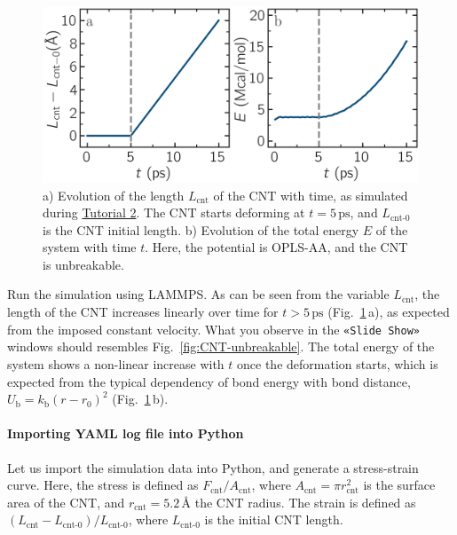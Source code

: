 \documentclass[9pt,tutorial]{livecoms}
\newcommand{\guicmd}[1]{\textcolor{command}{\texttt{«#1»}}} %
\begin{document}
\begin{figure}
\centering
\includegraphics[width=\linewidth]{CNT-unbreakable-length-energy}
\caption{a) Evolution of the length $L_\text{cnt}$ of the CNT with time,
as simulated during \hyperref[carbon-nanotube-label]{Tutorial 2}.
The CNT starts deforming at $t = 5\,\text{ps}$, and $L_\text{cnt-0}$ is the
CNT initial length.  b) Evolution of the total energy $E$ of the system
with time $t$.  Here, the potential is OPLS-AA, and the CNT is unbreakable.}
\label{fig:CNT-unbreakable-LE}
\end{figure}

Run the simulation using LAMMPS.  As can be seen from the variable $L_\text{cnt}$, the length
of the CNT increases linearly over time for $t > 5\,\text{ps}$ (Fig.~\ref{fig:CNT-unbreakable-LE}\,a),
as expected from the imposed constant velocity.  What you observe in the \guicmd{Slide Show}
windows should resembles Fig.~\ref{fig:CNT-unbreakable}.  The total energy of the system
shows a non-linear increase with $t$ once the deformation starts, which is expected
from the typical dependency of bond energy with bond distance,
$U_\text{b} = k_\text{b} \left( r - r_0 \right)^2$ (Fig.~\ref{fig:CNT-unbreakable-LE}\,b).

\paragraph{Importing YAML log file into Python}

Let us import the simulation data into Python, and generate a stress-strain curve.
Here, the stress is defined as $F_\text{cnt}/A_\text{cnt}$,
where $A_\text{cnt} = \pi r_\text{cnt}^2$ is the surface area of the
CNT, and $r_\text{cnt}=5.2$\,\AA{} the CNT radius.  The strain is defined
as $(L_\text{cnt}-L_\text{cnt-0})/L_\text{cnt-0}$, where $L_\text{cnt-0}$ is the initial CNT length.
\end{document}
